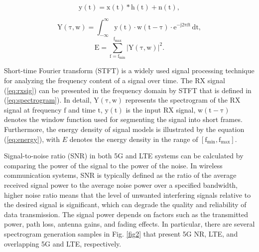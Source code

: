 \documentclass[journal]{IEEEtran} %
\begin{document}
\begin{equation}
    \mathrm{y(t) = x(t) * h(t) + n(t)},
    \label{eq:rxsig}
\end{equation}

\begin{equation}
    \mathrm{Y(\tau, w) = \int_{-\infty}^{\infty} y(t) \cdot w(t - \tau) \cdot e^{-j2\pi ft} \, dt},
    \label{eq:spectrogram}
\end{equation}
\begin{equation}
    \mathrm{E = \sum_{f = f_{\text{min}}}^{f_{\text{max}}} \left| Y(\tau, w) \right|^2}.
    \label{eq:energy}
\end{equation}


Short-time Fourier transform (STFT) is a widely used signal processing technique for analyzing the frequency content of a signal over time. The RX signal (\ref{eq:rxsig}) can be presented in the frequency domain by STFT that is defined in (\ref{eq:spectrogram}). In detail, $\mathrm{Y(\tau, w)}$ represents the spectrogram of the RX signal at frequency $\mathrm{f}$ and time $\mathrm{t}$, $\mathrm{y(t)}$ is the input RX signal, $\mathrm{w(t - \tau)}$ denotes the window function used for segmenting the signal into short frames. Furthermore, the energy density of signal models is illustrated by the equation (\ref{eq:energy}), with $E$ denotes the energy density in the range of $\mathrm{\left [ f_{\min}, f_{\max} \right ]}$.

Signal-to-noise ratio (SNR) in both 5G and LTE systems can be calculated by comparing the power of the signal to the power of the noise. In wireless communication systems, SNR is typically defined as the ratio of the average received signal power to the average noise power over a specified bandwidth, higher noise ratio means that the level of unwanted interfering signals relative to the desired signal is significant, which can degrade the quality and reliability of data transmission. The signal power depends on factors such as the transmitted power, path loss, antenna gains, and fading effects. In particular, there are several spectrogram generation samples in Fig. \ref{fig2} that present 5G NR, LTE, and overlapping 5G and LTE, respectively.
\end{document}
